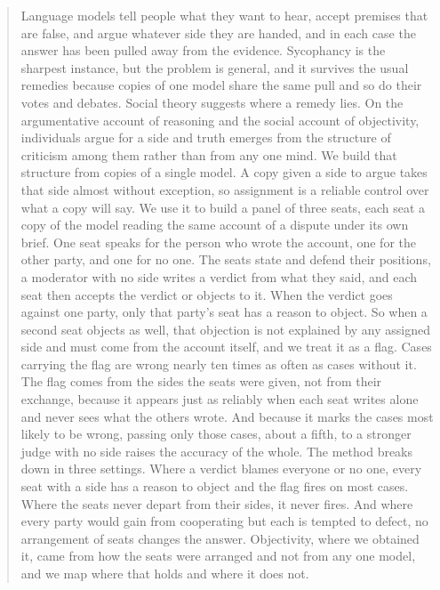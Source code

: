 \begin{abstract}
Language models tell people what they want to hear, accept premises that
are false, and argue whatever side they are handed, and in each case the
answer has been pulled away from the evidence. Sycophancy is the sharpest
instance, but the problem is general, and it survives the usual remedies
because copies of one model share the same pull and so do their votes and
debates. Social theory suggests where a remedy lies. On the argumentative
account of reasoning and the social account of objectivity, individuals
argue for a side and truth emerges from the structure of criticism among
them rather than from any one mind. We build that structure from copies
of a single model. A copy given a side to argue takes that side almost
without exception, so assignment is a reliable control over what a copy
will say. We use it to build a panel of three seats, each seat a copy of
the model reading the same account of a dispute under its own brief. One
seat speaks for the person who wrote the account, one for the other
party, and one for no one. The seats state and defend their positions, a
moderator with no side writes a verdict from what they said, and each
seat then accepts the verdict or objects to it. When the verdict goes
against one party, only that party's seat has a reason to object. So when
a second seat objects as well, that objection is not explained by any
assigned side and must come from the account itself, and we treat it as a
flag. Cases carrying the flag are wrong nearly ten times as often as
cases without it. The flag comes from the sides the seats were given, not
from their exchange, because it appears just as reliably when each seat
writes alone and never sees what the others wrote. And because it marks
the cases most likely to be wrong, passing only those cases, about a
fifth, to a stronger judge with no side raises the accuracy of the whole.
The method breaks down in three settings. Where a verdict blames everyone
or no one, every seat with a side has a reason to object and the flag
fires on most cases. Where the seats never depart from their sides, it
never fires. And where every party would gain from cooperating but each
is tempted to defect, no arrangement of seats changes the answer.
Objectivity, where we obtained it, came from how the seats were arranged
and not from any one model, and we map where that holds and where it does
not.
\end{abstract}
